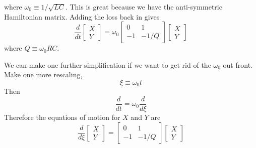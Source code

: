 \documentclass{article}
\begin{document}
where $\omega_{0}\equiv1/\sqrt{LC}$.
This is great because we have the anti-symmetric Hamiltonian matrix.
Adding the loss back in gives \begin{displaymath}
\frac{d}{dt} \left[ \begin{array}{c} X \\ Y \end{array} \right] =
\omega_0 \left[ \begin{array}{cc} 0 & 1 \\ -1 & -1/Q \end{array} \right]
\left[ \begin{array}{c} X \\ Y \end{array} \right] \end{displaymath}
where $Q\equiv \omega_0 R C$.

We can make one further simplification if we want to get rid of the $\omega_0$ out front.
Make one more rescaling,\begin{equation}
\xi\equiv\omega_{0}t \end{equation}
Then \begin{equation}
\frac{d}{dt}=\omega_{0}\frac{d}{d\xi}\end{equation}
Therefore the equations of motion for $X$ and $Y$ are \begin{equation}
\frac{d}{d\xi}\left[\begin{array}{c} X\\ Y\end{array}\right] = 
\left[\begin{array}{cc} 0 & 1\\ -1 & -1/Q \end{array}\right]
\left[\begin{array}{c} X\\ Y\end{array}\right]\end{equation}
\end{document}
